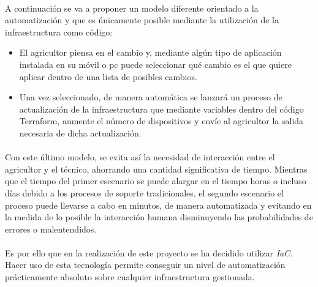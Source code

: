 \documentclass[../../memoria.tex]{subfiles}
\begin{document}
\paragraph{}
A continuación se va a proponer un modelo diferente orientado a la automatización y que es únicamente posible mediante la utilización de la infraestructura como código:

\begin{itemize}
    \item El agricultor piensa en el cambio y, mediante algún tipo de aplicación instalada en su móvil o pc puede seleccionar qué cambio es el que quiere aplicar dentro de una lista de posibles cambios.
    \item Una vez seleccionado, de manera automática se lanzará un proceso de actualización de la infraestructura que mediante variables dentro del código Terraform, aumente el número de dispositivos y envíe al agricultor la salida necesaria de dicha actualización.
\end{itemize}

\paragraph{}
Con este último modelo, se evita así la necesidad de interacción entre el agricultor y el técnico, ahorrando una cantidad significativa de tiempo. Mientras que el tiempo del primer escenario se puede alargar en el tiempo horas o incluso días debido a los procesos de soporte tradicionales, el segundo escenario el proceso puede llevarse a cabo en minutos, de manera automatizada y evitando en la medida de lo posible la interacción humana disminuyendo las probabilidades de errores o malentendidos.

\paragraph{}
Es por ello que en la realización de este proyecto se ha decidido utilizar \textit{IaC}. Hacer uso de esta tecnología permite conseguir un nivel de automatización prácticamente absoluto sobre cualquier infraestructura gestionada.
\end{document}
